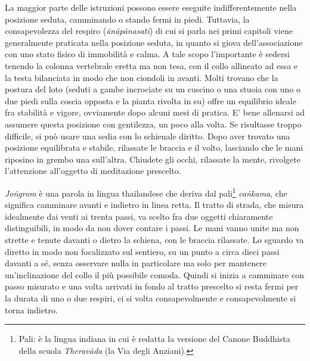 
La maggior parte delle istruzioni possono essere eseguite
indifferentemente nella posizione seduta, camminando o stando fermi in
piedi. Tuttavia, la consapevolezza del respiro (\textit{ānāpānasati}) di cui si
parla nei primi capitoli viene generalmente praticata nella posizione
seduta, in quanto si giova dell'associazione con uno stato fisico di
immobilità e calma. A tale scopo l'importante è sedersi tenendo la
colonna vertebrale eretta ma non tesa, con il collo allineato ad essa e
la testa bilanciata in modo che non ciondoli in avanti. Molti trovano
che la postura del loto (seduti a gambe incrociate su un cuscino o una
stuoia con uno o due piedi sulla coscia opposta e la pianta rivolta in
su) offre un equilibrio ideale fra stabilità e vigore, ovviamente dopo
alcuni mesi di pratica. E' bene allenarsi ad assumere questa posizione
con gentilezza, un poco alla volta. Se risultasse troppo difficile, si
può usare una sedia con lo schienale diritto. Dopo aver trovato una
posizione equilibrata e stabile, rilassate le braccia e il volto,
lasciando che le mani riposino in grembo una sull'altra. Chiudete gli
occhi, rilassate la mente, rivolgete l'attenzione all'oggetto di
meditazione prescelto.

\label{jongrom}
\textit{Joṅgrom} è una parola in lingua thailandese che deriva dal
pali\footnote{Pali: è la lingua indiana in cui è redatta la versione
del Canone Buddhista della scuola \textit{Theravāda} (la Via degli Anziani).}
\textit{caṅkama}, che significa camminare avanti e indietro in
linea retta. Il tratto di strada, che misura idealmente dai venti ai
trenta passi, va scelto fra due oggetti chiaramente distinguibili, in
modo da non dover contare i passi. Le mani vanno unite ma non strette e
tenute davanti o dietro la schiena, con le braccia rilassate. Lo sguardo
va diretto in modo non focalizzato sul sentiero, su un punto a circa
dieci passi davanti a sé, senza osservare nulla in particolare ma solo
per mantenere un'inclinazione del collo il più possibile comoda. Quindi
si inizia a camminare con passo misurato e una volta arrivati in fondo
al tratto prescelto si resta fermi per la durata di uno o due respiri,
ci si volta consapevolmente e consapevolmente si torna indietro.

